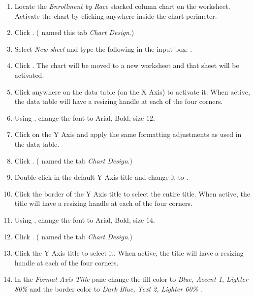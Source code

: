 \begin{enumbox}
	\begin{enumerate}
		\item Locate the \textit{Enrollment by Race} stacked column chart on the  worksheet. Activate the chart by clicking anywhere inside the chart perimeter.
		\item Click . ( named this tab \textit{Chart Design}.) 
		\item Select \textit{New sheet} and type the following in the input box: . 
		\item Click . The chart will be moved to a new worksheet and that sheet will be activated.
		\item Click anywhere on the data table (on the X Axis) to activate it. When active, the data table will have a resizing handle at each of the four corners.
		\item Using , change the font to Arial, Bold, size $ 12 $.
		\item Click on the Y Axis and apply the same formatting adjustments as used in the data table. 
		\item Click . ( named the tab \textit{Chart Design}.)
		\item Double-click in the default Y Axis title and change it to .
		\item Click the border of the Y Axis title to select the entire title. When active, the title will have a resizing handle at each of the four corners.
		\item Using , change the font to Arial, Bold, size $ 14 $.
		\item Click . ( named the tab \textit{Chart Design}.)
		\item Click the Y Axis title to select it. When active, the title will have a resizing handle at each of the four corners.
		\item In the \textit{Format Axis Title} pane change the fill color to \textit{Blue, Accent 1, Lighter 80\%} and the border color to \textit{Dark Blue, Text 2, Lighter 60\%} .

\end{enumerate}
\end{enumbox}

